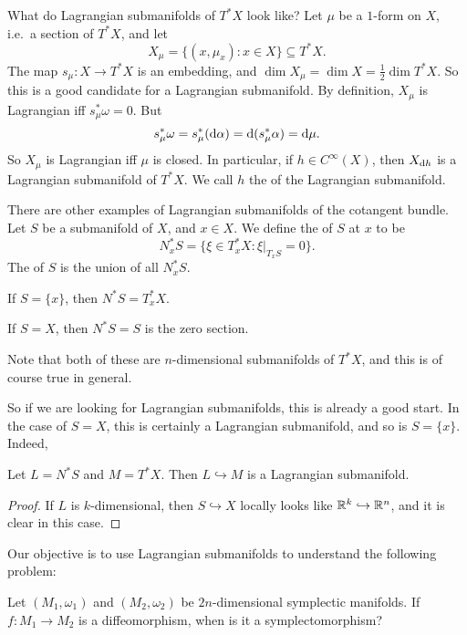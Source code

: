 \documentclass[a4paper]{article}
\begin{document}
What do Lagrangian submanifolds of $T^* X$ look like? Let $\mu$ be a $1$-form on $X$, i.e.\ a section of $T^* X$, and let
\[
  X_\mu = \{(x, \mu_x): x \in X\} \subseteq T^* X.
\]
The map $s_\mu: X \to T^*X$ is an embedding, and $\dim X_\mu = \dim X = \frac{1}{2} \dim T^* X$. So this is a good candidate for a Lagrangian submanifold. By definition, $X_\mu$ is Lagrangian iff $s_\mu^* \omega = 0$. But
\[
  s_\mu^* \omega = s_\mu^* (\mathrm{d} \alpha) = \mathrm{d} (s_\mu^* \alpha) = \mathrm{d} \mu.
\]
So $X_\mu$ is Lagrangian iff $\mu$ is closed. In particular, if $h \in C^\infty(X)$, then $X_{\mathrm{d} h}$ is a Lagrangian submanifold of $T^* X$. We call $h$ the  of the Lagrangian submanifold.

There are other examples of Lagrangian submanifolds of the cotangent bundle. Let $S$ be a submanifold of $X$, and $x \in X$. We define the  of $S$ at $x$ to be
\[
  N_x^* S = \{\xi \in T_x^* X : \xi|_{T_x S} = 0\}.
\]
The  of $S$ is the union of all $N^*_x S$.

\begin{eg}
  If $S = \{x\}$, then $N^*S = T^*_x X$.
\end{eg}

\begin{eg}
  If $S = X$, then $N^*S = S$ is the zero section.
\end{eg}

Note that both of these are $n$-dimensional submanifolds of $T^*X$, and this is of course true in general.

So if we are looking for Lagrangian submanifolds, this is already a good start. In the case of $S = X$, this is certainly a Lagrangian submanifold, and so is $S = \{x\}$. Indeed,
\begin{prop}
  Let $L = N^* S$ and $M = T^* X$. Then $L \hookrightarrow M$ is a Lagrangian submanifold.
\end{prop}

\begin{proof}
  If $L$ is $k$-dimensional, then $S \hookrightarrow X$ locally looks like $\mathbb{R}^k \hookrightarrow \mathbb{R}^n$, and it is clear in this case.
\end{proof}

Our objective is to use Lagrangian submanifolds to understand the following problem:
\begin{problem}
  Let $(M_1, \omega_1)$ and $(M_2, \omega_2)$ be $2n$-dimensional symplectic manifolds. If $f: M_1 \to M_2$ is a diffeomorphism, when is it a symplectomorphism?
\end{problem}
\end{document}
